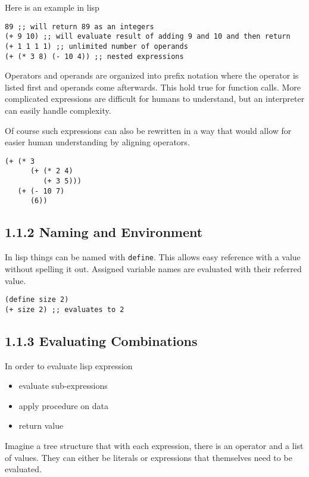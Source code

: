 \documentclass[11pt]{article}
\begin{document}
Here is an example in lisp

\begin{verbatim}
89 ;; will return 89 as an integers
(+ 9 10) ;; will evaluate result of adding 9 and 10 and then return
(+ 1 1 1 1) ;; unlimited number of operands
(+ (* 3 8) (- 10 4)) ;; nested expressions
\end{verbatim}

Operators and operands are organized into prefix notation where the
operator is listed first and operands come afterwards. This hold true
for function calls. More complicated expressions are difficult for
humans to understand, but an interpreter can easily handle complexity.

Of course such expressions can also be rewritten in a way that would
allow for easier human understanding by aligning operators.

\begin{verbatim}
(+ (* 3
      (+ (* 2 4)
         (+ 3 5)))
   (+ (- 10 7)
      (6))
\end{verbatim}

\subsection{1.1.2 Naming and Environment}
\label{sec:orgc5b7642}
In lisp things can be named with \texttt{define}. This allows easy reference
with a value without spelling it out. Assigned variable names are
evaluated with their referred value.

\begin{verbatim}
(define size 2)
(+ size 2) ;; evaluates to 2
\end{verbatim}

\subsection{1.1.3 Evaluating Combinations}
\label{sec:orgd1d791c}
In order to evaluate lisp expression

\begin{itemize}
\item evaluate sub-expressions
\item apply procedure on data
\item return value
\end{itemize}

Imagine a tree structure that with each expression, there is an operator
and a list of values. They can either be literals or expressions that
themselves need to be evaluated.
\end{document}

